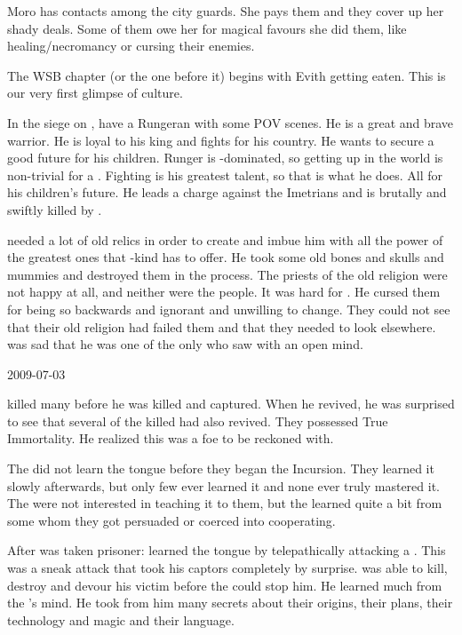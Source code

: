 Moro has contacts among the city guards.
She pays them and they cover up her shady deals.
Some of them owe her for magical favours she did them, like healing/necromancy or cursing their enemies.

The WSB chapter (or the one before it) begins with Evith getting eaten.
This is our very first glimpse of \resphan culture.

In the siege on \Forklin, have a Rungeran \scatha with some POV scenes.
He is a great and brave warrior.
He is loyal to his king and fights for his country.
He wants to secure a good future for his children.
Runger is \human-dominated, so getting up in the world is non-trivial for a \scatha.
Fighting is his greatest talent, so that is what he does.
All for his children's future.
He leads a charge against the Imetrians and is brutally and swiftly killed by \nycans.

\Semiza needed a lot of old \aryoth relics in order to create \Thanatzil and imbue him with all the power of the greatest ones that \nephil-kind has to offer.
He took some old bones and skulls and mummies and destroyed them in the process.
The priests of the old religion were not happy at all, and neither were the people.
It was hard for \Semiza.
He cursed them for being so backwards and ignorant and unwilling to change.
They could not see that their old religion had failed them and that they needed to look elsewhere.
\Semiza was sad that he was one of the only \nephilim who saw with an open mind.



2009-07-03

\Nexagglachel killed many \resphain before he was killed and captured.
When he revived, he was surprised to see that several of the killed \resphain had also revived.
They possessed True Immortality.
He realized this was a foe to be reckoned with.

The \resphain did not learn the \draconic tongue before they began the Incursion. 
They learned it slowly afterwards, but only few ever learned it and none ever truly mastered it.
The \dragons were not interested in teaching it to them, but the \resphain learned quite a bit from some \quiljaaran whom they got persuaded or coerced into cooperating.

After \Nexagglachel was taken prisoner:
\Nexagglachel learned the \resphan tongue by telepathically attacking a \resphan.
This was a sneak attack that took his captors completely by surprise.
\Nexagglachel was able to kill, destroy and devour his victim before the \resphain could stop him.
He learned much from the \resphan's mind.
He took from him many secrets about their origins, their plans, their technology and magic and their language.

